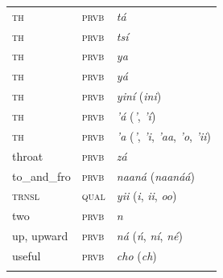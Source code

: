 \begin{xltabular}{\textwidth}{llX}
 \textsc{th} & \textsc{prvb} & \textit{tá}\\
 \textsc{th} & \textsc{prvb} & \textit{tsí}\\
 \textsc{th} & \textsc{prvb} & \textit{ya}\\
 \textsc{th} & \textsc{prvb} & \textit{yá}\\
 \textsc{th} & \textsc{prvb} & \textit{yiní} (\textit{ini})\\
 \textsc{th} & \textsc{prvb} & \textit{’á} (\textit{’}, \textit{’í})\\
 \textsc{th} & \textsc{prvb} & \textit{’a} (\textit{’}, \textit{’i}, \textit{’aa}, \textit{’o}, \textit{’ii})\\
 throat & \textsc{prvb} & \textit{zá}\\
 to\_and\_fro & \textsc{prvb} & \textit{naaná} (\textit{naanáá})\\
 \textsc{trnsl} & \textsc{qual} & \textit{yii} (\textit{i}, \textit{ii}, \textit{oo})\\
 two &\textsc{prvb} & \textit{n}\\
 up, upward & \textsc{prvb} & \textit{ná} (\textit{ń}, \textit{ní}, \textit{né})\\
 useful & \textsc{prvb} & \textit{cho} (\textit{ch})\\
\lspbottomrule
\end{xltabular}